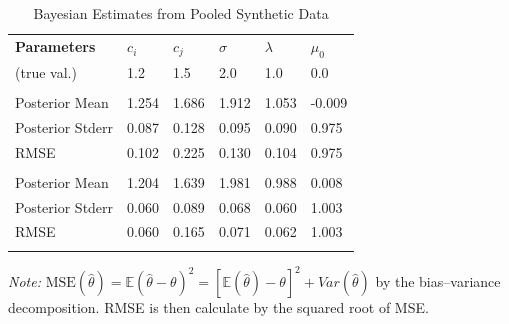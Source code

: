 \documentclass[mnsc]{informs3}
\begin{document}
\begin{table}[htbp]
\centering
\caption{Bayesian Estimates from Pooled Synthetic Data}\label{tbl-pool-synthetic-data}
\begin{tabularx}{\textwidth}{lYYYYY}
\toprule
\textbf{Parameters} & \textbf{$c_i$} & \textbf{$c_j$} & \textbf{$\sigma$} & \textbf{$\lambda$} & \textbf{$\mu_0$}\\
\addlinespace[0.25ex]
\addlinespace[0.25ex]
(true val.)        & 1.2 & 1.5 & 2.0 & 1.0 & 0.0\\
\midrule
\addlinespace
{} \\
Posterior Mean  & 1.254 & 1.686 & 1.912 & 1.053 & -0.009\\
Posterior Stderr & 0.087 & 0.128 & 0.095 & 0.090 & 0.975\\
RMSE                & 0.102 & 0.225 & 0.130 & 0.104 & 0.975\\
\addlinespace
{} \\
Posterior Mean  & 1.204 & 1.639 & 1.981 & 0.988 & 0.008\\
Posterior Stderr & 0.060 & 0.089 & 0.068 & 0.060 & 1.003\\
RMSE                & 0.060 & 0.165 & 0.071 & 0.062 & 1.003\\
\bottomrule
\addlinespace[0.5ex]
\end{tabularx}
\begin{minipage}{\textwidth}
{\footnotesize
\textit{Note:} $\text{MSE}(\hat\theta) = \mathbb{E}(\hat{\theta}-\theta)^2 = [\mathbb{E}(\hat{\theta}) - \theta]^2 + Var(\hat{\theta})$ by the bias–variance decomposition. RMSE is then calculate by the squared root of MSE. 
}
\end{minipage}
\end{table}

\end{document}
